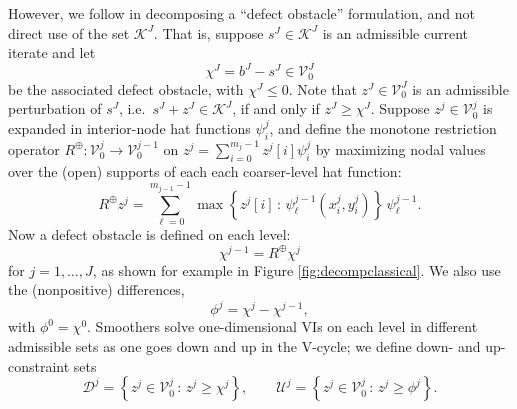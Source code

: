 \documentclass[letterpaper,final,12pt,reqno]{amsart}
\theoremstyle{claim}
\newcommand{\mR}{R^{\bm{\oplus}}}
\numberwithin{equation}{section}
\numberwithin{figure}{section}
\numberwithin{table}{section}
\numberwithin{theorem}{section}
\begin{document}
However, we follow \cite{GraeserKornhuber2009} in decomposing a ``defect obstacle'' formulation, and not direct use of the set $\mathcal{K}^J$.  That is, suppose $s^J \in \mathcal{K}^J$ is an admissible current iterate and let
\begin{equation}
\chi^J = b^J - s^J \in \mathcal{V}_0^J \label{eq:finedefectobstacle}
\end{equation}
be the associated defect obstacle, with $\chi^J \le 0$.  Note that $z^J \in \mathcal{V}_0^J$ is an admissible perturbation of $s^J$, i.e.~$s^J+z^J \in \mathcal{K}^J$, if and only if $z^J \ge \chi^J$.  Suppose $z^j \in \mathcal{V}_0^j$ is expanded in interior-node hat functions $\psi_i^j$, and define the monotone restriction operator $\mR : \mathcal{V}_0^j \to \mathcal{V}_0^{j-1}$ \cite{GraeserKornhuber2009} on $z^j = \sum_{i=0}^{m_j-1} z^j[i] \psi_i^j$ by maximizing nodal values over the (open) supports of each each coarser-level hat function:
\begin{equation}
\mR z^j = \sum_{\ell=0}^{m_{j-1}-1} \max\left\{z^j[i] \,:\,\psi_\ell^{j-1}(x_i^j,y_i^j) \right\}\,\psi_\ell^{j-1}.  \label{eq:monotonerestriction}
\end{equation}
Now a defect obstacle is defined on each level:
\begin{equation}
\chi^{j-1} = \mR \chi^j  \label{eq:recursivedefectobstacle}
\end{equation}
for $j=1,\dots,J$, as shown for example in Figure \ref{fig:decompclassical}.  We also use the (nonpositive) differences,
\begin{equation}
\phi^j = \chi^j - \chi^{j-1},  \label{eq:downobstacles}
\end{equation}
with $\phi^0=\chi^0$.  Smoothers solve one-dimensional VIs on each level in different admissible sets as one goes down and up in the V-cycle; we define down- and up-constraint sets
\begin{equation}
\mathcal{D}^j = \left\{z^j \in \mathcal{V}_0^j \,:\, z^j \ge \chi^j\right\}, \qquad \mathcal{U}^j = \left\{z^j \in \mathcal{V}_0^j \,:\, z^j \ge \phi^j\right\}. \label{eq:downupsets}
\end{equation}
\end{document}
